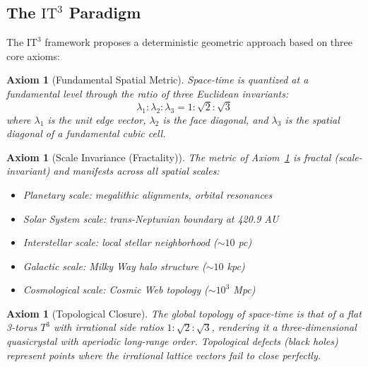 \documentclass[12pt,a4paper,oneside]{article}
\newtheorem{axiom}[theorem]{Axiom}
\newcommand{\ITthree}{\text{IT}^3}
\begin{document}
\subsection{The $\ITthree$ Paradigm}

The $\ITthree$ framework proposes a deterministic geometric approach based on three core axioms:

\begin{axiom}[Fundamental Spatial Metric]
\label{ax:metric}
Space-time is quantized at a fundamental level through the ratio of three Euclidean invariants:
\begin{equation}
    \boxed{\lambda_1 : \lambda_2 : \lambda_3 = 1 : \sqrt{2} : \sqrt{3}}
\end{equation}
where $\lambda_1$ is the unit edge vector, $\lambda_2$ is the face diagonal, and $\lambda_3$ is the spatial diagonal of a fundamental cubic cell.
\end{axiom}

\begin{axiom}[Scale Invariance (Fractality)]
\label{ax:fractal}
The metric of Axiom~\ref{ax:metric} is fractal (scale-invariant) and manifests across all spatial scales:
\begin{itemize}
    \item Planetary scale: megalithic alignments, orbital resonances
    \item Solar System scale: trans-Neptunian boundary at 420.9 AU
    \item Interstellar scale: local stellar neighborhood ($\sim 10$ pc)
    \item Galactic scale: Milky Way halo structure ($\sim 10$ kpc)
    \item Cosmological scale: Cosmic Web topology ($\sim 10^3$ Mpc)
\end{itemize}
\end{axiom}

\begin{axiom}[Topological Closure]
\label{ax:torus}
The global topology of space-time is that of a flat 3-torus $T^3$ with irrational side ratios $1:\sqrt{2}:\sqrt{3}$, rendering it a three-dimensional quasicrystal with aperiodic long-range order. Topological defects (black holes) represent points where the irrational lattice vectors fail to close perfectly.
\end{axiom}

\end{document}
